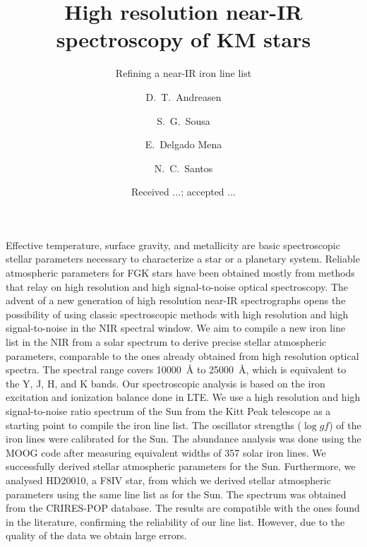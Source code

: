 \documentclass{aa}
\begin{document}
\title{High resolution near-IR spectroscopy of KM stars}
\subtitle{Refining a near-IR iron line list}


\author{ D.~T.~Andreasen
    \and S.~G.~Sousa
    \and E.~Delgado Mena
    \and N.~C.~Santos}







\date{Received ...; accepted ...}

\abstract
{Effective temperature, surface gravity, and metallicity are basic
spectroscopic stellar parameters necessary to characterize
a star or a planetary system. Reliable atmospheric parameters for
FGK stars have been obtained mostly from methods that relay on high
resolution and high signal-to-noise optical spectroscopy. The
advent of a new generation of high resolution near-IR spectrographs
opens the possibility of using classic spectroscopic methods with
high resolution and high signal-to-noise in the NIR spectral window.}
{We aim to compile a new iron line list in the NIR from a solar
spectrum to derive precise stellar atmospheric parameters,
comparable to the ones already obtained from high resolution optical
spectra. The spectral range covers \SI{10000}{\angstrom} to
\SI{25000}{\angstrom}, which is equivalent to the Y, J, H, and K bands.}
{Our spectroscopic analysis is based on the iron excitation and
ionization balance done in LTE. We
use a high resolution and high signal-to-noise ratio spectrum of the Sun
from the Kitt Peak telescope as a starting point to compile the iron
line list. The oscillator strengths ($\log\mathit{gf}$) of the iron lines were calibrated for the Sun.
The abundance analysis was done using
the MOOG code after measuring equivalent widths of 357 solar iron lines.}
{We successfully derived stellar atmospheric parameters for the
Sun.
Furthermore, we analysed
HD20010, a F8IV star, from which we derived stellar atmospheric
parameters using the same line list as for the Sun. The spectrum
was obtained from the CRIRES-POP database.
The results are compatible with the ones found in the literature,
confirming the reliability of our line list. However, due to the
quality of the data we obtain large errors.}
{}
\end{document}
